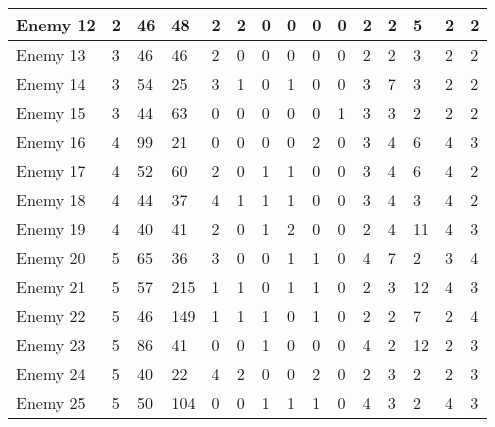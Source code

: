 \begin{sidewaystable}[!h]
{\begin{tabular}{|l|l|l|l|l|l|l|l|l|l|l|l|l|l|l|}
		Enemy 12 & 2 & 46 & 48 & 2 & 2 & 0 & 0 & 0 & 0 & 2 & 2 & 5 & 2 & 2 \\ \hline
		Enemy 13 & 3 & 46 & 46 & 2 & 0 & 0 & 0 & 0 & 0 & 2 & 2 & 3 & 2 & 2 \\ \hline
		Enemy 14 & 3 & 54 & 25 & 3 & 1 & 0 & 1 & 0 & 0 & 3 & 7 & 3 & 2 & 2 \\ \hline
		Enemy 15 & 3 & 44 & 63 & 0 & 0 & 0 & 0 & 0 & 1 & 3 & 3 & 2 & 2 & 2 \\ \hline
		Enemy 16 & 4 & 99 & 21 & 0 & 0 & 0 & 0 & 2 & 0 & 3 & 4 & 6 & 4 & 3 \\ \hline
		Enemy 17 & 4 & 52 & 60 & 2 & 0 & 1 & 1 & 0 & 0 & 3 & 4 & 6 & 4 & 2 \\ \hline
		Enemy 18 & 4 & 44 & 37 & 4 & 1 & 1 & 1 & 0 & 0 & 3 & 4 & 3 & 4 & 2 \\ \hline
		Enemy 19 & 4 & 40 & 41 & 2 & 0 & 1 & 2 & 0 & 0 & 2 & 4 & 11 & 4 & 3 \\ \hline
		Enemy 20 & 5 & 65 & 36 & 3 & 0 & 0 & 1 & 1 & 0 & 4 & 7 & 2 & 3 & 4 \\ \hline
		Enemy 21 & 5 & 57 & 215 & 1 & 1 & 0 & 1 & 1 & 0 & 2 & 3 & 12 & 4 & 3 \\ \hline
		Enemy 22 & 5 & 46 & 149 & 1 & 1 & 1 & 0 & 1 & 0 & 2 & 2 & 7 & 2 & 4 \\ \hline
		Enemy 23 & 5 & 86 & 41 & 0 & 0 & 1 & 0 & 0 & 0 & 4 & 2 & 12 & 2 & 3 \\ \hline
		Enemy 24 & 5 & 40 & 22 & 4 & 2 & 0 & 0 & 2 & 0 & 2 & 3 & 2 & 2 & 3 \\ \hline
		Enemy 25 & 5 & 50 & 104 & 0 & 0 & 1 & 1 & 1 & 0 & 4 & 3 & 2 & 4 & 3 \\ \hline
	\end{tabular}%
	}
\end{sidewaystable}
\clearpage


